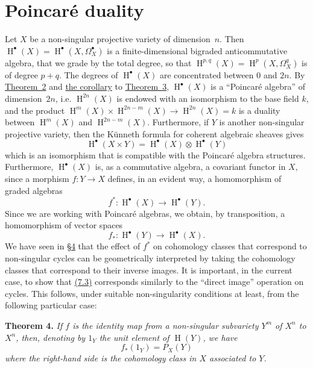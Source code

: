 \documentclass{article}
\newenvironment{itenv}[1]
  {\phantomsection\par\medskip\noindent\textbf{#1.}\itshape}
  {\par\medskip}
\DeclareMathOperator{\HH}{H}
\newcommand{\oldpage}[1]{\marginpar{\footnotesize$\Big\vert$ \textit{p.~#1}}}
\begin{document}
\section{Poincar\'{e} duality}
\label{section7}

Let $X$ be a non-singular projective variety of dimension~$n$.
Then $\HH^\bullet(X)=\HH^\bullet(X,\Omega_X^\bullet)$ is a finite-dimensional bigraded anticommutative algebra, that we grade by the total degree, so that $\HH^{p,q}(X)=\HH^p(X,\Omega_X^q)$ is of degree $p+q$.
The degrees of $\HH^\bullet(X)$ are concentrated between $0$ and $2n$.
By \hyperref[theorem2]{Theorem~2} and \hyperref[theorem3corollary]{the corollary} to \hyperref[theorem3]{Theorem~3}, $\HH^\bullet(X)$ is a ``Poincar\'{e} algebra'' of dimension~$2n$, i.e. $\HH^{2n}(X)$ is endowed with an isomorphism to the base field $k$, and the product $\HH^m(X)\times\HH^{2n-m}(X)\to\HH^{2n}(X)=k$ is a duality between $\HH^m(X)$ and $\HH^{2n-m}(X)$.
Furthermore, if $Y$ is another non-singular projective variety, then the K\"{u}nneth formula for coherent algebraic sheaves gives
\[
\label{7.1}
  \HH^\bullet(X\times Y) = \HH^\bullet(X)\otimes\HH^\bullet(Y)
\tag{7.1}
\]
which is an isomorphism that is compatible with the Poincar\'{e} algebra structures.
Furthermore, $\HH^\bullet(X)$ is, as a commutative algebra, a covariant functor in $X$, since a morphism $f\colon Y\to X$ defines, in an evident way, a homomorphism of graded algebras
\oldpage{149-20}
\[
\label{7.2}
  f^*\colon \HH^\bullet(X)\to\HH^\bullet(Y).
\tag{7.2}
\]
Since we are working with Poincar\'{e} algebras, we obtain, by transposition, a homomorphism of vector spaces
\[
\label{7.3}
  f_*\colon \HH^\bullet(Y)\to\HH^\bullet(X).
\tag{7.3}
\]
We have seen in \hyperref[section4]{\S4} that the effect of $f^*$ on cohomology classes that correspond to non-singular cycles can be geometrically interpreted by taking the cohomology classes that correspond to their inverse images.
It is important, in the current case, to show that \hyperref[7.3]{(7.3)} corresponds similarly to the ``direct image'' operation on cycles.
This follows, under suitable non-singularity conditions at least, from the following particular case:

\begin{itenv}{Theorem 4}
\label{theorem4}
  If $f$ is the identity map from a non-singular subvariety $Y^m$ of $X^n$ to $X^n$, then, denoting by $1_Y$ the unit element of $\HH(Y)$, we have
  \[
  \label{7.4}
    f_*(1_Y) = P_X(Y)
  \tag{7.4}
  \]
  where the right-hand side is the cohomology class in $X$ associated to $Y$.
\end{itenv}
\end{document}
